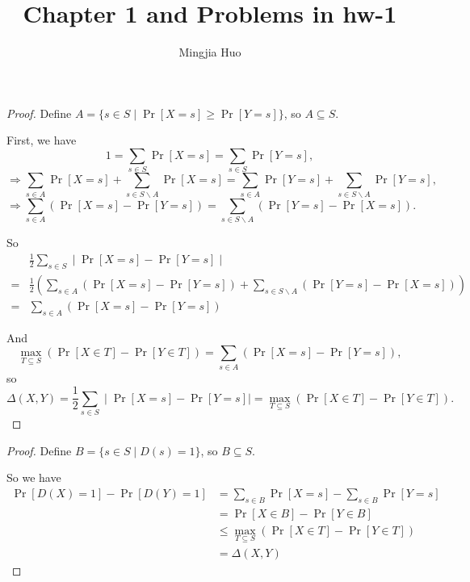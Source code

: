\documentclass[12pt]{article}
\newenvironment{problem}[2][Problem]{\begin{trivlist}
\item[\hskip \labelsep {\bfseries #1}\hskip \labelsep {\bfseries #2.}]}{\end{trivlist}}
\begin{document}
 
\title{Chapter 1 and Problems in hw-1}
\author{Mingjia Huo}
\date{}
\maketitle

\begin{problem}{1.Part A}
\begin{proof}
Define $A=\{s\in S\mid \Pr[X=s]\ge \Pr[Y=s]\}$, so $A\subseteq S$.

First, we have
$$1=\sum_{s\in S}\Pr[X=s]=\sum_{s\in S}\Pr[Y=s],$$
$$\Rightarrow \sum_{s\in A}\Pr[X=s]+\sum_{s\in S\backslash A}\Pr[X=s] =\sum_{s\in A}\Pr[Y=s]+\sum_{s\in S\backslash A}\Pr[Y=s], $$
$$\Rightarrow\sum_{s\in A}(\Pr[X=s]-\Pr[Y=s]) = \sum_{s\in S\backslash A}(\Pr[Y=s]-\Pr[X=s]). $$

So 
\begin{align*}
&\frac 12\sum_{s\in S}\mid \Pr[X=s]-\Pr[Y=s]\mid\\
=&\frac12\left(\sum_{s\in A}(\Pr[X=s]-\Pr[Y=s])+\sum_{s\in S\backslash A}(\Pr[Y=s]-\Pr[X=s]) \right)\\
=&\sum_{s\in A}(\Pr[X=s]-\Pr[Y=s])
\end{align*}

And $$\max\limits_{T\subseteq S}(\Pr[X\in T]-\Pr[Y\in T])=\sum\limits_{s\in A}(\Pr[X=s]-\Pr[Y=s]),$$ so 
$$\Delta(X,Y)=\frac 12\sum_{s\in S}\mid \Pr[X=s]-\Pr[Y=s]\mid=\max\limits_{T\subseteq S}(\Pr[X\in T]-\Pr[Y\in T]).$$
\end{proof}
\end{problem}

\begin{problem}{1.Part B}
\begin{proof}
Define $B=\{s\in S\mid D(s)=1\}$, so $B\subseteq S$.

So we have
\begin{align*}
\Pr[D(X)=1]-\Pr[D(Y)=1]&=\sum_{s\in B}\Pr[X=s]-\sum_{s\in B}\Pr[Y=s] \\
&=\Pr[X\in B]-\Pr[Y\in B]\\
&\le \max\limits_{T\subseteq S}(\Pr[X\in T]-\Pr[Y\in T])\\
&=\Delta(X,Y)
\end{align*}
\end{proof}
\end{problem}
\end{document}
